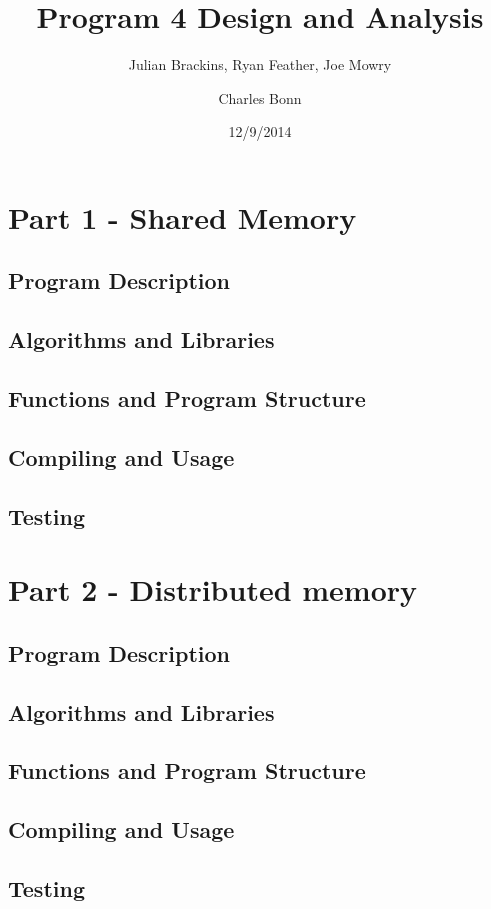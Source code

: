 \documentclass{article}
\begin{document}
\title{Program 4 Design and Analysis}
\author{Julian Brackins, Ryan Feather, Joe Mowry \and Charles Bonn}
\date{12/9/2014}
\maketitle

\section{Part 1 - Shared Memory}

\subsection{Program Description}

\subsection{Algorithms and Libraries}


\subsection{Functions and Program Structure}


\subsection{Compiling and Usage}


\subsection{Testing}


\section{Part 2 - Distributed memory}
\subsection{Program Description}

\subsection{Algorithms and Libraries}



\subsection{Functions and Program Structure}



\subsection{Compiling and Usage}



\subsection{Testing}
\end{document}
